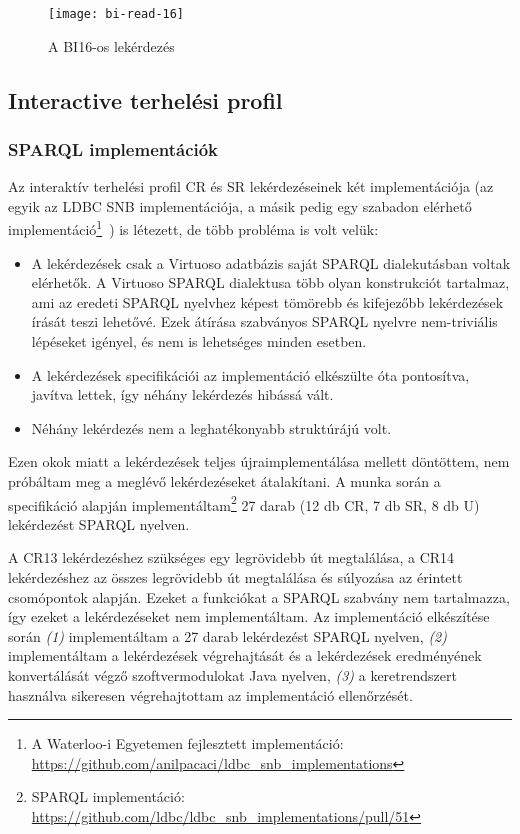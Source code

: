 \begin{figure}[!ht]
	\centering
	\texttt{[image: bi-read-16]}
	\caption[]{A BI16-os lekérdezés}
	\label{fig:bi16}
\end{figure}

\subsection{Interactive terhelési profil}
\subsubsection{SPARQL implementációk}

Az interaktív terhelési profil CR és SR lekérdezéseinek két implementációja (az egyik az LDBC SNB implementációja, a másik pedig egy szabadon elérhető implementáció\footnote{A Waterloo-i Egyetemen fejlesztett implementáció: \url{https://github.com/anilpacaci/ldbc_snb_implementations}}~\cite{DBLP:conf/grades/PacaciZLO17}) is létezett, de több probléma is volt velük:
\begin{itemize}
	\item A lekérdezések csak a Virtuoso adatbázis saját SPARQL dialekutásban voltak elérhetők. A Virtuoso SPARQL dialektusa több olyan konstrukciót tartalmaz, ami az eredeti SPARQL nyelvhez képest tömörebb és kifejezőbb lekérdezések írását teszi lehetővé. Ezek átírása szabványos SPARQL nyelvre nem-triviális lépéseket igényel, és nem is lehetséges minden esetben.
	\item A lekérdezések specifikációi az implementáció elkészülte óta pontosítva, javítva lettek, így néhány lekérdezés hibássá vált.
	\item Néhány lekérdezés nem a leghatékonyabb struktúrájú volt.
\end{itemize}
Ezen okok miatt a lekérdezések teljes újraimplementálása mellett döntöttem, nem próbáltam meg a meglévő lekérdezéseket átalakítani. A munka során a specifikáció alapján implementáltam\footnote{SPARQL implementáció: \url{https://github.com/ldbc/ldbc_snb_implementations/pull/51}} 27 darab (12 db CR, 7 db SR, 8 db U) lekérdezést SPARQL nyelven.

A CR13 lekérdezéshez szükséges egy legrövidebb út megtalálása, a CR14 lekérdezéshez az összes legrövidebb út megtalálása és súlyozása az érintett csomópontok alapján. Ezeket a funkciókat a SPARQL szabvány nem tartalmazza, így ezeket a lekérdezéseket nem implementáltam. Az implementáció elkészítése során \textit{(1)} implementáltam a 27 darab lekérdezést SPARQL nyelven, \textit{(2)} implementáltam a lekérdezések végrehajtását és a lekérdezések eredményének konvertálását végző szoftvermodulokat Java nyelven, \textit{(3)} a keretrendszert használva sikeresen végrehajtottam az implementáció ellenőrzését.

